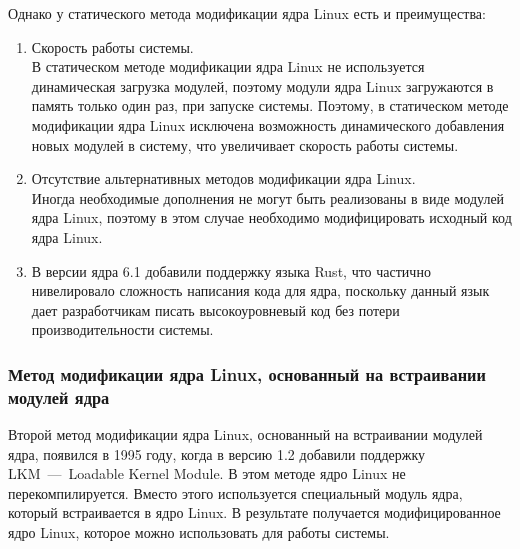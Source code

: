 Однако у статического метода модификации ядра Linux есть и преимущества:

\begin{enumerate}
    \item Скорость работы системы. \vspace{1mm}\\
    В статическом методе модификации ядра Linux не используется динамическая загрузка модулей, поэтому модули ядра Linux загружаются в память только один раз, при запуске системы.
    Поэтому, в статическом методе модификации ядра Linux исключена возможность динамического добавления новых модулей в систему, что увеличивает скорость работы системы.
    \item Отсутствие альтернативных методов модификации ядра Linux.\vspace{1mm}\\
    Иногда необходимые дополнения не могут быть реализованы в виде модулей ядра Linux, поэтому в этом случае необходимо модифицировать исходный код ядра Linux.
    \item В версии ядра 6.1 добавили поддержку языка Rust, что частично нивелировало сложность написания кода для ядра, поскольку данный язык дает разработчикам писать высокоуровневый код без потери производительности системы.
\end{enumerate}

\subsubsection{Метод модификации ядра Linux, основанный на встраивании модулей ядра}\label{subsec:---linux-----}

Второй метод модификации ядра Linux, основанный на встраивании модулей ядра, появился в 1995 году, когда в версию 1.2 добавили поддержку LKM~---~Loadable Kernel Module.
В этом методе ядро Linux не перекомпилируется.
Вместо этого используется специальный модуль ядра, который встраивается в ядро Linux.
В результате получается модифицированное ядро Linux, которое можно использовать для работы системы.

